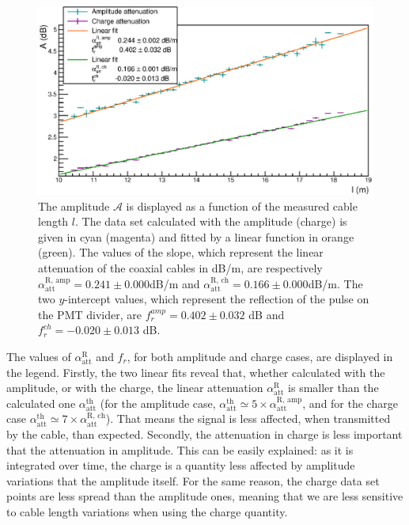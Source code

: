 \begin{figure}
  \centering
  \includegraphics[width=15cm]{commissioning/fig_commissioning/attenuation_length.eps}
  \caption{The amplitude $\mathcal{A}$ is displayed as a function of the measured cable length $l$.
    The data set calculated with the amplitude (charge) is given in cyan (magenta) and fitted by a linear function in orange (green).
    The values of the slope, which represent the linear attenuation of the coaxial cables in dB/m, are respectively $\alpha_{\text{att}}^{\text{R, amp}} = 0.241\pm 0.000$dB/m and $\alpha_{\text{att}}^{\text{R, ch}} = 0.166\pm0.000$dB/m.
    The two $y$-intercept values, which represent the reflection of the pulse on the PMT divider, are $f_{r}^{amp} = 0.402\pm 0.032$ dB and $f_{r}^{ch} = -0.020\pm 0.013$ dB.
    \label{fig:attenuation}}
\end{figure}
The values of $\alpha_{\text{att}}^{\text{R}}$ and $f_{r}$, for both amplitude and charge cases, are displayed in the legend.
Firstly, the two linear fits reveal that, whether calculated with the amplitude, or with the charge, the linear attenuation $\alpha_{\text{att}}^{\text{R}}$ is smaller than the calculated one $\alpha_{\text{att}}^{\text{th}}$ (for the amplitude case, $\alpha_{\text{att}}^{\text{th}}\simeq 5\times \alpha_{\text{att}}^{\text{R, amp}}$, and for the charge case $\alpha_{\text{att}}^{\text{th}}\simeq 7\times \alpha_{\text{att}}^{\text{R, ch}}$).
That means the signal is less affected, when transmitted by the cable, than expected.
Secondly, the attenuation in charge is less important that the attenuation in amplitude.
This can be easily explained: as it is integrated over time, the charge is a quantity less affected by amplitude variations that the amplitude itself.
For the same reason, the charge data set points are less spread than the amplitude ones, meaning that we are less sensitive to cable length variations when using the charge quantity.


